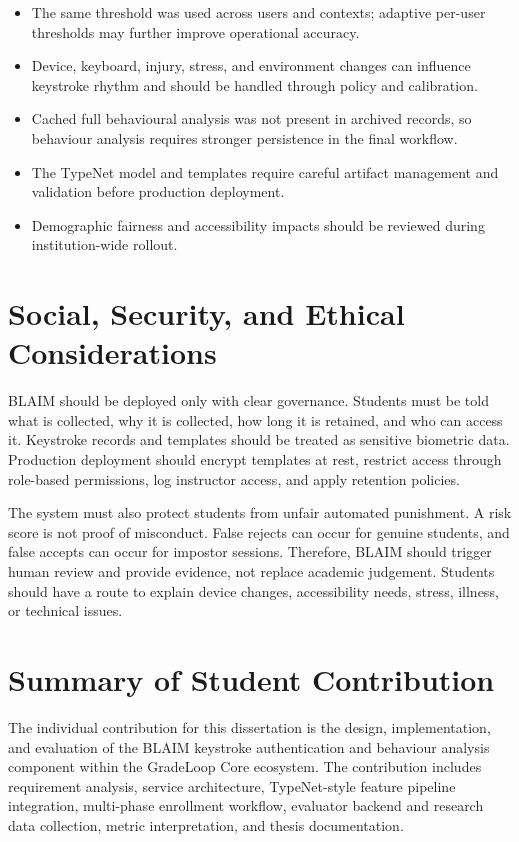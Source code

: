 \begin{itemize}
  \item The same threshold was used across users and contexts; adaptive per-user thresholds may further improve operational accuracy.
  \item Device, keyboard, injury, stress, and environment changes can influence keystroke rhythm and should be handled through policy and calibration.
  \item Cached full behavioural analysis was not present in archived records, so behaviour analysis requires stronger persistence in the final workflow.
  \item The TypeNet model and templates require careful artifact management and validation before production deployment.
  \item Demographic fairness and accessibility impacts should be reviewed during institution-wide rollout.
\end{itemize}

\section{Social, Security, and Ethical Considerations}
\label{sec:ethics}

BLAIM should be deployed only with clear governance. Students must be told what is collected, why it is collected, how long it is retained, and who can access it. Keystroke records and templates should be treated as sensitive biometric data. Production deployment should encrypt templates at rest, restrict access through role-based permissions, log instructor access, and apply retention policies.

The system must also protect students from unfair automated punishment. A risk score is not proof of misconduct. False rejects can occur for genuine students, and false accepts can occur for impostor sessions. Therefore, BLAIM should trigger human review and provide evidence, not replace academic judgement. Students should have a route to explain device changes, accessibility needs, stress, illness, or technical issues.

\section{Summary of Student Contribution}
\label{sec:student-contribution}

The individual contribution for this dissertation is the design, implementation, and evaluation of the BLAIM keystroke authentication and behaviour analysis component within the GradeLoop Core ecosystem. The contribution includes requirement analysis, service architecture, TypeNet-style feature pipeline integration, multi-phase enrollment workflow, evaluator backend and research data collection, metric interpretation, and thesis documentation.

\clearpage
